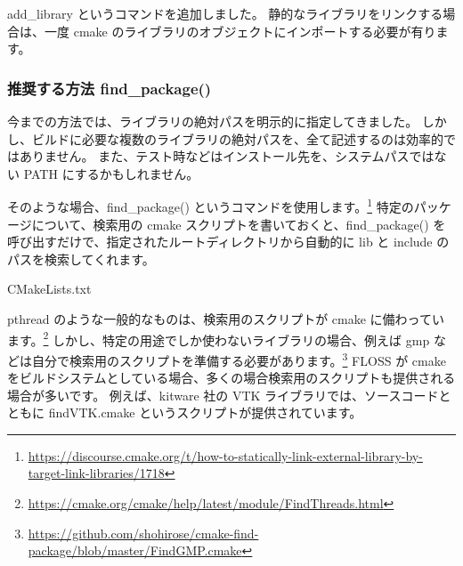 \documentclass[mingoth,a4paper]{jsarticle}
\begin{document}
add\_library というコマンドを追加しました。
静的なライブラリをリンクする場合は、一度 cmake のライブラリのオブジェクトにインポートする必要が有ります。

\subsubsection{推奨する方法 find\_package()}

今までの方法では、ライブラリの絶対パスを明示的に指定してきました。
しかし、ビルドに必要な複数のライブラリの絶対パスを、全て記述するのは効率的ではありません。
また、テスト時などはインストール先を、システムパスではない PATH にするかもしれません。

そのような場合、find\_package() というコマンドを使用します。\footnote{\url{https://discourse.cmake.org/t/how-to-statically-link-external-library-by-target-link-libraries/1718}}
特定のパッケージについて、検索用の cmake スクリプトを書いておくと、find\_package() を呼び出すだけで、指定されたルートディレクトリから自動的に lib と include のパスを検索してくれます。

\vspace{1em}
CMakeLists.txt

pthread のような一般的なものは、検索用のスクリプトが cmake に備わっています。\footnote{\url{https://cmake.org/cmake/help/latest/module/FindThreads.html}}
しかし、特定の用途でしか使わないライブラリの場合、例えば gmp などは自分で検索用のスクリプトを準備する必要があります。\footnote{\url{https://github.com/shohirose/cmake-find-package/blob/master/FindGMP.cmake}}
FLOSS が cmake をビルドシステムとしている場合、多くの場合検索用のスクリプトも提供される場合が多いです。
例えば、kitware 社の VTK ライブラリでは、ソースコードとともに findVTK.cmake というスクリプトが提供されています。
\end{document}
